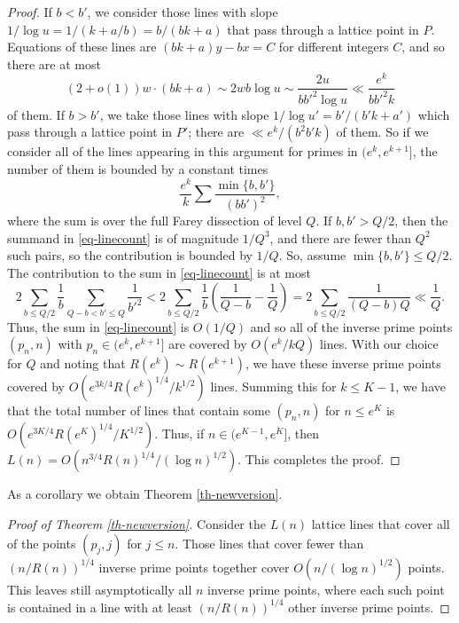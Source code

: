 \documentclass[10pt]{article}
\theoremstyle{definition}
\theoremstyle{remark}
\numberwithin{equation}{section}
\begin{document}
\begin{proof}
If $b<b'$, we
consider those lines with slope $1/\log u=1/(k+a/b)=b/(bk+a)$ that pass through a lattice point in $P$.
Equations of these lines are $(bk+a)y - bx = C$ for different integers $C$,
and so there are at most
\[
(2+o(1))w \cdot (bk+a)\sim 2wb\log u\sim\frac{2u}{bb'^2\log u}\ll\frac{e^k}{bb'^2k}
\]
of them.  If $b>b'$, we take those lines with slope $1/\log u'=b'/(b'k+a')$ which pass through a
lattice point in $P'$; there are $\ll e^k/(b^2b'k)$ of them.
So if we consider all of the lines appearing in this argument for primes in $(e^k,e^{k+1}]$,
the number of them is bounded by a constant times
\begin{equation}
\label{eq-linecount}
\frac{e^k}k\sum\frac{\min\{b,b'\}}{(bb')^2},
\end{equation}
where the sum is over the full Farey dissection of level $Q$.  If $b,b'>Q/2$, then the summand
in \eqref{eq-linecount} is of magnitude $1/Q^3$, and there are fewer than $Q^2$ such pairs,
so the contribution is bounded by $1/Q$.  So, assume $\min\{b,b'\}\le Q/2$.
The contribution to the sum in \eqref{eq-linecount} is at most
\[
2\sum_{b\le Q/2}\frac1b\sum_{Q-b<b'\le Q}\frac1{b'^2}
<2\sum_{b\le Q/2}\frac1b\left(\frac1{Q-b}-\frac1Q\right)
=2\sum_{b\le Q/2}\frac1{(Q-b)Q}\ll\frac1Q.
\]
Thus, the sum in \eqref{eq-linecount} is $O(1/Q)$ and so all of the inverse prime points $(p_n,n)$ with $p_n\in(e^k,e^{k+1}]$ are covered by 
$O(e^k/kQ)$ lines.  With our choice for $Q$
and noting that $R(e^k)\sim R(e^{k+1})$, we have these inverse prime points covered
by $O(e^{3k/4}R(e^k)^{1/4}/k^{1/2})$ lines.  Summing this for $k\le K-1$, we have that the total number of lines that contain
some $(p_n,n)$ for $n\le e^K$ is $O(e^{3K/4}R(e^K)^{1/4}/K^{1/2})$.  Thus, if $n\in(e^{K-1},e^K]$, then
$L(n)=O(n^{3/4}R(n)^{1/4}/(\log n)^{1/2})$.  This completes the proof.
\end{proof}

As a corollary we obtain Theorem \ref{th-newversion}.

\begin{proof}[Proof of Theorem \ref{th-newversion}]
Consider the $L(n)$ lattice lines that cover all of the
points $(p_j,j)$ for $j\le n$.  Those lines that cover fewer than $(n/R(n))^{1/4}$
inverse prime points together cover $O(n/(\log n)^{1/2})$ points.  This leaves
still asymptotically all $n$ inverse prime points, where each such point
is contained in a line with at least  $(n/R(n))^{1/4}$ other inverse prime points.
 \end{proof}
\end{document}
